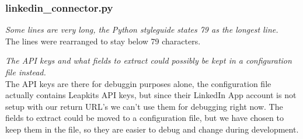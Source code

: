 \subsubsection{linkedin\_connector.py}
\begin{itemize*}
    \item \textit{Some lines are very long, the Python styleguide states 79 as the longest line.}\\
          The lines were rearranged to stay below 79 characters.
    \item \textit{The API keys and what fields to extract could possibly be kept in a configuration file instead.}\\
          The API keys are there for debuggin purposes alone, the configuration file actually contains Leapkits API keys, but since their LinkedIn App account is not setup with our return URL's we can't use them for debugging right now.
          The fields to extract could be moved to a configuration file, but we have chosen to keep them in the file, so they are easier to debug and change during development.
\end{itemize*}
